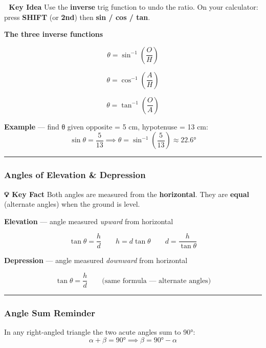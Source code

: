 \documentclass[
  letterpaper,
  DIV=11,
  numbers=noendperiod]{scrreprt}
\theoremstyle{definition}
\theoremstyle{remark}
\begin{document}
\textbf{📝 Key Idea} Use the \textbf{inverse} trig function to undo the
ratio. On your calculator: press \textbf{SHIFT} (or \textbf{2nd}) then
\textbf{sin / cos / tan}.

\textbf{The three inverse functions}

\[\theta = \sin^{-1}\!\left(\frac{O}{H}\right)\]

\[\theta = \cos^{-1}\!\left(\frac{A}{H}\right)\]

\[\theta = \tan^{-1}\!\left(\frac{O}{A}\right)\]

\textbf{Example} --- find θ given opposite = 5 cm, hypotenuse = 13 cm:
\[\sin\theta = \frac{5}{13} \implies \theta = \sin^{-1}\!\left(\frac{5}{13}\right) \approx 22.6°\]

\begin{center}\rule{0.5\linewidth}{0.5pt}\end{center}

\subsubsection*{Angles of Elevation \&
Depression}\label{angles-of-elevation-depression}

\textbf{💡 Key Fact} Both angles are measured from the
\textbf{horizontal}. They are \textbf{equal} (alternate angles) when the
ground is level.

\textbf{Elevation} --- angle measured \emph{upward} from horizontal

\[\tan\theta = \frac{h}{d} \qquad h = d\tan\theta \qquad d = \frac{h}{\tan\theta}\]

\textbf{Depression} --- angle measured \emph{downward} from horizontal

\[\tan\theta = \frac{h}{d} \qquad \text{(same formula — alternate angles)}\]

\begin{center}\rule{0.5\linewidth}{0.5pt}\end{center}

\subsubsection*{Angle Sum Reminder}\label{angle-sum-reminder}

In any right-angled triangle the two acute angles sum to 90°:
\[\alpha + \beta = 90° \implies \beta = 90° - \alpha\]
\end{document}

